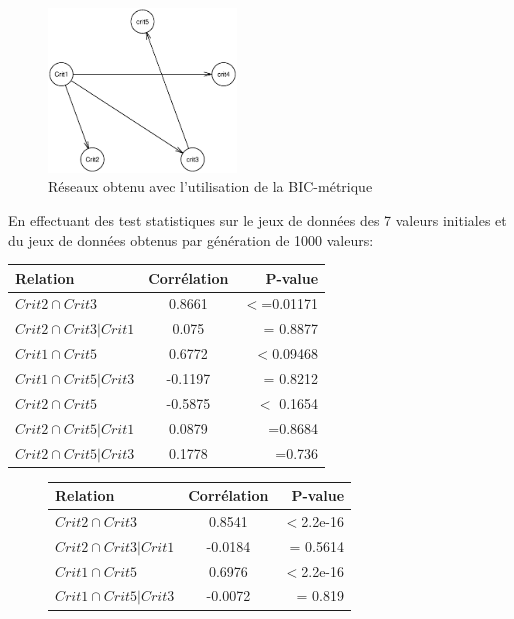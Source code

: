 \documentclass[a4paper]{article}
\begin{document}
\begin{appendices}
\begin{figure}[H] 
    \center
    \includegraphics[width=5cm]{grapheterrain.eps} 
    \caption{Réseaux obtenu avec l'utilisation de la BIC-métrique} 
\end{figure} 
\newpage
En effectuant des test statistiques sur le jeux de données des 7 valeurs initiales  et du jeux de données obtenus par génération de 1000 valeurs:
\begin{center}
\begin{tabular}{|l|c|r|}
  \hline
  Relation & Corrélation & P-value \\
  \hline
   $Crit2 \cap  Crit3$& 0.8661& $<$=0.01171  \\
      $ Crit2 \cap Crit3 | Crit1$       & 0.075                    & = 0.8877   \\
 \hline
\hline
$Crit1  \cap  Crit5$ &     0.6772    & $<$0.09468 \\
$Crit1  \cap  Crit5|Crit3$ &     -0.1197  & = 0.8212\\
\hline \hline

$Crit2  \cap  Crit5$ & -0.5875 &  $<$ 0.1654 \\
$Crit2  \cap  Crit5|Crit1$ & 0.0879& =0.8684\\
$Crit2 \cap Crit5 |Crit3$ &   0.1778& =0.736 \\
\hline
\end{tabular}
\end{center}


\begin{figure}[H]
\begin{center}
\begin{tabular}{|l|c|r|}
  \hline
  Relation & Corrélation & P-value \\
  \hline
   $Crit2 \cap  Crit3$& 0.8541& $<$2.2e-16  \\
      $ Crit2 \cap Crit3 | Crit1$       & -0.0184                      & = 0.5614   \\
 \hline
\hline
$Crit1  \cap  Crit5$ &     0.6976    & $<$2.2e-16 \\
$Crit1  \cap  Crit5|Crit3$ &     -0.0072   & = 0.819 \\
\hline \hline


\end{tabular}
\end{center}
\end{figure}
\end{appendices}
\end{document}
